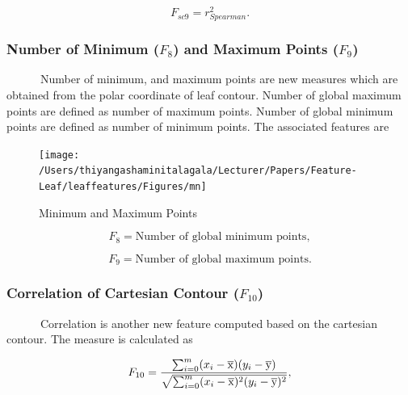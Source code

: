 \documentclass{article}
\begin{document}
\begin{equation}
    F_{sc9} = r^2_{Spearman}.
\end{equation}

\hypertarget{number-of-minimum-f_8-and-maximum-points-f_9}{%
\subsubsection{\texorpdfstring{Number of Minimum (\(F_8\)) and Maximum
Points
(\(F_9\))}{Number of Minimum (F\_8) and Maximum Points (F\_9)}}\label{number-of-minimum-f_8-and-maximum-points-f_9}}

~~~~~~Number of minimum, and maximum points are new measures which are
obtained from the polar coordinate of leaf contour. Number of global
maximum points are defined as number of maximum points. Number of global
minimum points are defined as number of minimum points. The associated
features are

\begin{figure}[!ht]

{\centering \texttt{[image: /Users/thiyangashaminitalagala/Lecturer/Papers/Feature-Leaf/leaffeatures/Figures/mn]} 

}

\caption{\label{mn}Minimum and Maximum Points}\label{fig:unnamed-chunk-34}
\end{figure}

\begin{equation}
   F_8 =  \text{Number of global minimum points},
\label{equa_F8}
\end{equation}

\begin{equation}
   F_9 =  \text{Number of global maximum points}.
\label{equa_F9}
\end{equation}

\hypertarget{correlation-of-cartesian-contour-f_10}{%
\subsubsection{\texorpdfstring{Correlation of Cartesian Contour
(\(F_{10}\))}{Correlation of Cartesian Contour (F\_\{10\})}}\label{correlation-of-cartesian-contour-f_10}}

~~~~~~Correlation is another new feature computed based on the cartesian
contour. The measure is calculated as

\begin{equation}
   F_{10} =  \frac{\sum_{i=0}^{m}(x_i - \overline{\rm x})(y_i - \overline{\rm y})}{\sqrt{\sum_{i=0}^{m} (x_i - \overline{\rm x})^2 (y_i - \overline{\rm y})^2}},
\label{equa_F10}
\end{equation}
\end{document}
